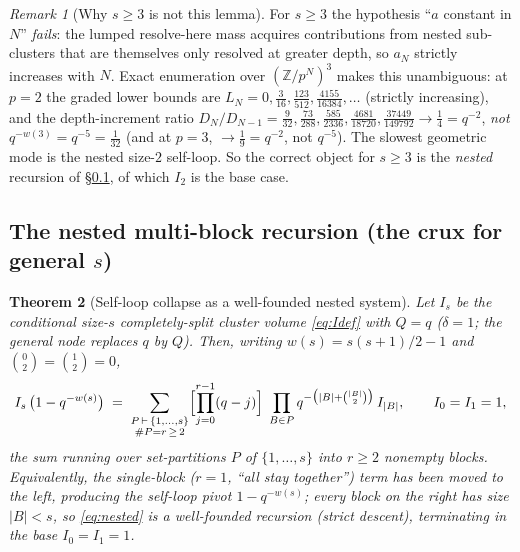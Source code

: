 \documentclass[11pt]{article}
\newtheorem{theorem}{Theorem}
\theoremstyle{definition}
\theoremstyle{remark}
\newtheorem{remark}[theorem]{Remark}
\begin{document}
\begin{remark}[Why $s\ge3$ is not this lemma]\label{rem:slowmode}
For $s\ge3$ the hypothesis ``$a$ constant in $N$'' \emph{fails}: the lumped
resolve-here mass acquires contributions from nested sub-clusters that are
themselves only resolved at greater depth, so $a_N$ strictly increases with $N$.
Exact enumeration over $(\mathbb Z/p^N)^3$ makes this unambiguous: at $p=2$ the
graded lower bounds are
$L_N=0,\tfrac3{16},\tfrac{123}{512},\tfrac{4155}{16384},\dots$ (strictly
increasing), and the depth-increment ratio
$D_N/D_{N-1}=\tfrac9{32},\tfrac{73}{288},\tfrac{585}{2336},\tfrac{4681}{18720},
\tfrac{37449}{149792}\to\tfrac14=q^{-2}$, \emph{not} $q^{-w(3)}=q^{-5}=\tfrac1{32}$
(and at $p=3$, $\to\tfrac19=q^{-2}$, not $q^{-5}$). The slowest geometric mode is
the nested size-$2$ self-loop. So the correct object for $s\ge3$ is the
\emph{nested} recursion of \S\ref{sec:nested}, of which $I_2$ is the base case.
\end{remark}

\subsection{The nested multi-block recursion (the crux for general $s$)}\label{sec:nested}

\begin{theorem}[Self-loop collapse as a well-founded nested system]\label{thm:nested}
Let $I_s$ be the conditional size-$s$ completely-split cluster volume
\eqref{eq:Idef} with $Q=q$ ($\delta=1$; the general node replaces $q$ by $Q$). Then,
writing $w(s)=s(s+1)/2-1$ and $\binom{0}{2}=\binom12=0$,
\begin{equation}\label{eq:nested}
  I_s\,\bigl(1-q^{-w(s)}\bigr)
  \;=\;
  \sum_{\substack{P\,\vdash\,\{1,\dots,s\}\\ \#P=r\,\ge\,2}}
    \Bigl[\prod_{j=0}^{r-1}(q-j)\Bigr]
    \;\prod_{B\in P} q^{-\bigl(|B|+\binom{|B|}2\bigr)}\,I_{|B|},
  \qquad I_0=I_1=1,
\end{equation}
the sum running over set-partitions $P$ of $\{1,\dots,s\}$ into $r\ge2$ nonempty
blocks. Equivalently, the single-block ($r=1$, ``all stay together'') term has been
moved to the left, producing the self-loop pivot $1-q^{-w(s)}$; every block on the
right has size $|B|<s$, so \eqref{eq:nested} is a \emph{well-founded} recursion
(strict descent), terminating in the base $I_0=I_1=1$.
\end{theorem}
\end{document}
